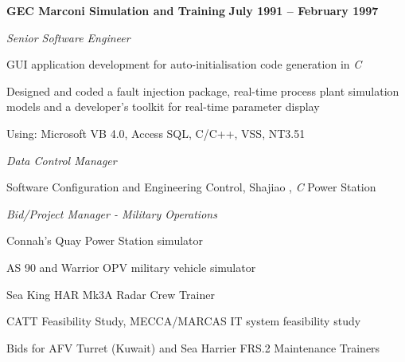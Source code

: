 \documentclass[10pt]{article}
\newenvironment{outerlist}[1][\enskip\textbullet]%
        {\begin{itemize}[#1]}{\end{itemize}%
         \vspace{-.6\baselineskip}}
\newenvironment{innerlist}[1][\enskip\textbullet]%
        {\begin{compactitem}[#1]}{\end{compactitem}}
\newcommand{\blankline}{\quad\pagebreak[2]}
\begin{document}
\blankline

\textbf{GEC Marconi Simulation and Training}        \hfill \textbf{July 1991 -- February 1997}

\begin{outerlist}

\item[] \textit{Senior Software Engineer}%
\begin{innerlist}
\item GUI application development for auto-initialisation code generation in \textit{C}
\item Designed and coded a fault injection package, real-time process plant simulation models and a developer's toolkit for real-time parameter display
\item Using: Microsoft VB 4.0, Access SQL, C/C++, VSS, NT3.51
\end{innerlist}

\item[] \textit{Data Control Manager}
\begin{innerlist}
\item Software Configuration and Engineering Control, Shajiao , \textit{C} Power Station
\end{innerlist}

\item[] \textit{Bid/Project Manager - Military Operations}%
\begin{innerlist}
\item Connah's Quay Power Station simulator
\item AS 90 and Warrior OPV military vehicle simulator
\item Sea King HAR Mk3A Radar Crew Trainer 
\item CATT Feasibility Study, MECCA/MARCAS IT system feasibility study
\item Bids for AFV Turret (Kuwait) and Sea Harrier FRS.2 Maintenance Trainers

%
\end{innerlist}


\end{outerlist}
\end{document}
